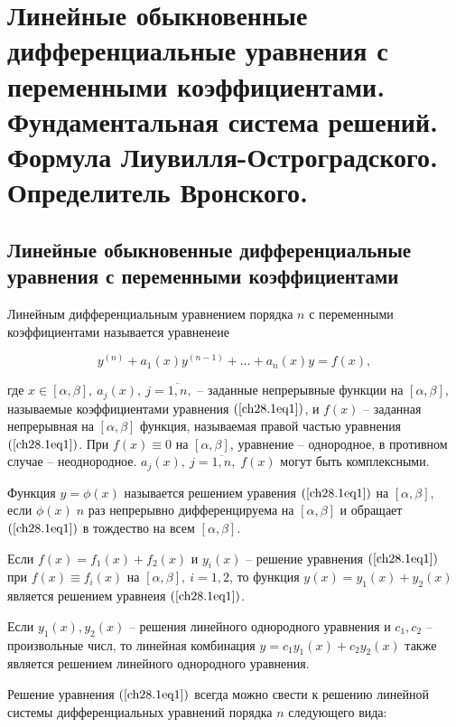\chapter{Линейные обыкновенные дифференциальные уравнения с переменными коэффициентами. Фундаментальная система решений. Формула Лиувилля-Остроградского. Определитель Вронского.}

\section{Линейные обыкновенные дифференциальные уравнения с переменными коэффициентами}

Линейным дифференциальным уравнением порядка $n$ с переменными коэффициентами называется уравненеие 

\begin{equation} \label{ch28.1eq1}
y^{(n)} + a_1(x)y^{(n - 1)} + \ldots + a_n(x)y = f(x),
\end{equation}

где $x \in [\alpha, \beta], \: a_j(x), \: j = \overline{1,n},$ -- заданные непрерывные функции на $[\alpha, \beta]$, называемые коэффициентами уравнения $(\ref{ch28.1eq1})$, и $f(x)$ -- заданная непрерывная на $[\alpha, \beta]$ функция, называемая правой частью уравнения $(\ref{ch28.1eq1})$. При $f(x) \equiv 0$ на $[\alpha, \beta]$, уравнение -- однородное, в противном случае -- неоднородное. $a_j(x), \: j = \overline{1,n}, \; f(x)$ могут быть комплексными.

Функция $y = \phi(x)$ называется решением уравения $(\ref{ch28.1eq1})$ на $[\alpha, \beta]$, если $\phi(x) \; n$ раз непрерывно дифференцируема на $[\alpha, \beta]$ и обращает $(\ref{ch28.1eq1})$ в тождество на всем $[\alpha, \beta]$.

\begin{lemm}
Если $f(x) = f_1(x) + f_2(x)$ и $y_i(x)$ -- решение уравнения $(\ref{ch28.1eq1})$ при $f(x) \equiv f_i(x)$ на $[\alpha, \beta], \: i = 1,2$, то функция $y(x) = y_1(x) + y_2(x)$ является решением уравнеия $(\ref{ch28.1eq1})$.
\end{lemm}  

\begin{cons}
Если $y_1(x), y_2(x)$ -- решения линейного однородного уравнения и $c_1, c_2$ -- произвольные числ, то линейная комбинация $y = c_1y_1(x) + c_2y_2(x)$ также является решением линейного однородного уравнения.
\end{cons}

Решение уравнения $(\ref{ch28.1eq1})$ всегда можно свести к решению линейной системы дифференциальных уравнений порядка $n$ следующего вида:

